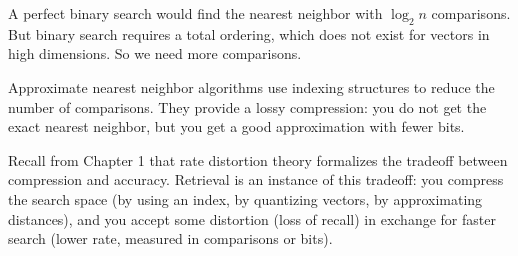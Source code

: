 \vspace{1em}

A perfect binary search would find the nearest neighbor with $\log_2 n$ comparisons. But binary search requires a total ordering, which does not exist for vectors in high dimensions. So we need more comparisons.

Approximate nearest neighbor algorithms use indexing structures to reduce the number of comparisons. They provide a lossy compression: you do not get the exact nearest neighbor, but you get a good approximation with fewer bits.

\vspace{1em}

Recall from Chapter 1 that rate distortion theory formalizes the tradeoff between compression and accuracy. Retrieval is an instance of this tradeoff: you compress the search space (by using an index, by quantizing vectors, by approximating distances), and you accept some distortion (loss of recall) in exchange for faster search (lower rate, measured in comparisons or bits).

\vspace{1.5em}

